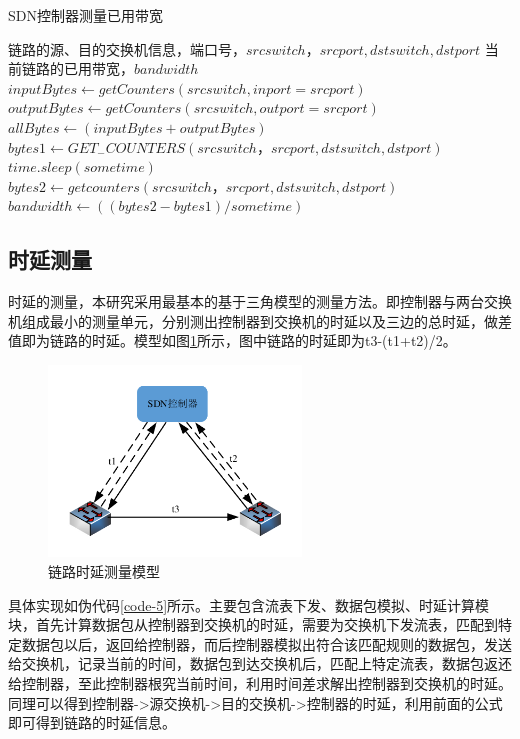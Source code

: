 \begin{algorithm}[!htb]
    \caption{SDN控制器测量已用带宽}
    \label{code-4}
    \begin{algorithmic}[1] %
        \Require 链路的源、目的交换机信息，端口号，$srcswitch，srcport,dstswitch,dstport$
        \Ensure 当前链路的已用带宽，$bandwidth$
        	\State $inputBytes \gets getCounters(srcswitch, inport=srcport)$
        	\State $outputBytes \gets getCounters(srcswitch, outport=srcport)$
        	\State $allBytes \gets (inputBytes+outputBytes)$
        	\State {}
        \EndFunction
        	\State $bytes1 \gets GET_{-}COUNTERS(srcswitch，srcport, dstswitch,dstport)$
        	\State $time.sleep(sometime)$
        	\State $bytes2 \gets getcounters(srcswitch，srcport, dstswitch,dstport)$
        	\State $bandwidth \gets ((bytes2-bytes1)/sometime)$
         	\State {}
        \EndFunction
    \end{algorithmic}
\end{algorithm}
\subsection{时延测量}
时延的测量，本研究采用最基本的基于三角模型的测量方法。即控制器与两台交换机组成最小的测量单元，分别测出控制器到交换机的时延以及三边的总时延，做差值即为链路的时延。模型如图\ref{fig:delay}所示，图中链路的时延即为t3-(t1+t2)/2。

\begin{figure}[!htb]
  \centering
  \includegraphics[width=0.6\textwidth]{logo/delay}
  \caption{链路时延测量模型}
  \label{fig:delay}
\end{figure}

具体实现如伪代码\ref{code-5}所示。主要包含流表下发、数据包模拟、时延计算模块，首先计算数据包从控制器到交换机的时延，需要为交换机下发流表，匹配到特定数据包以后，返回给控制器，而后控制器模拟出符合该匹配规则的数据包，发送给交换机，记录当前的时间，数据包到达交换机后，匹配上特定流表，数据包返还给控制器，至此控制器根究当前时间，利用时间差求解出控制器到交换机的时延。同理可以得到控制器->源交换机->目的交换机->控制器的时延，利用前面的公式即可得到链路的时延信息。

